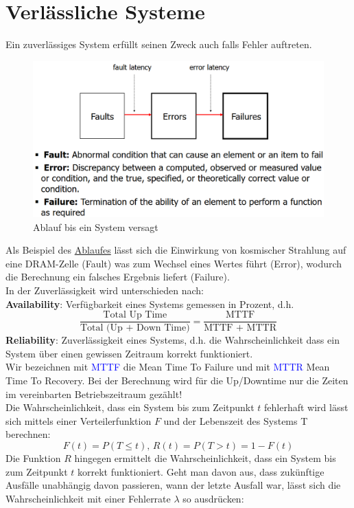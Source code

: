 \documentclass[a4paper,12pt]{article}
\newcommand{\blue}[1]{\textcolor{blue}{#1}}
\begin{document}
\section{Verlässliche Systeme}
Ein zuverlässiges System erfüllt seinen Zweck auch falls Fehler auftreten.
\begin{figure}
\centering
\includegraphics[scale=0.4]{Grafiken/AblaufZumVersagen.png}
\caption{Ablauf bis ein System versagt}
\label{Image:Versagensplan}
\end{figure}
Als Beispiel des \hyperref[Image:Versagensplan]{Ablaufes} lässt sich die Einwirkung von kosmischer Strahlung auf eine DRAM-Zelle (Fault) was zum Wechsel eines Wertes führt (Error), wodurch die Berechnung ein falsches Ergebnis liefert (Failure).\\
In der Zuverlässigkeit wird unterschieden nach:\\
\textbf{Availability}: Verfügbarkeit eines Systems gemessen in Prozent, d.h. 
$$\frac{\textrm{Total Up Time}}{\textrm{Total (Up + Down Time)}}=\frac{\textrm{MTTF}}{\textrm{MTTF + MTTR}}$$
\textbf{Reliability}: Zuverlässigkeit eines Systems, d.h. die Wahrscheinlichkeit dass ein System über einen gewissen Zeitraum korrekt funktioniert.\\
Wir bezeichnen mit \blue{MTTF} die Mean Time To Failure und mit \blue{MTTR} Mean Time To Recovery. Bei der Berechnung wird für die Up/Downtime nur die Zeiten im vereinbarten Betriebszeitraum gezählt!\\
Die Wahrscheinlichkeit, dass ein System bis zum Zeitpunkt $t$ fehlerhaft wird lässt sich mittels einer Verteilerfunktion $F$ und der Lebenszeit des Systems T berechnen:
$$F(t)=P(T\leq t)\textrm{, } R(t)=P(T>t)=1-F(t)$$
Die Funktion $R$ hingegen ermittelt die Wahrscheinlichkeit, dass ein System bis zum Zeitpunkt $t$ korrekt funktioniert.
Geht man davon aus, dass zukünftige Ausfälle unabhängig davon passieren, wann der letzte Ausfall war, lässt sich die Wahrscheinlichkeit mit einer Fehlerrate $\lambda$ so ausdrücken:\\
\end{document}

